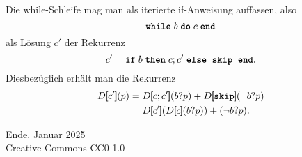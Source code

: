 \documentclass[8pt,fleqn,aspectratio=169]{beamer}
\newcommand{\modest}[1]{{\small\color{gray}#1}}
\newcommand{\kw}[1]{\textbf{\texttt{#1}}}
\newcommand{\qb}[1]{[\!\![#1]\!\!]}
\begin{document}
\begin{frame}[fragile]
Die while-Schleife mag man als iterierte if-Anweisung auffassen, also
\[\kw{while}\; b\; \kw{do}\; c\; \kw{end}\]
als Lösung $c'$ der Rekurrenz
\[c' = \kw{if}\; b\; \kw{then}\; c; c'\;
\kw{else}\;\; \kw{skip}\;\; \kw{end}.\]\pause
Diesbezüglich erhält man die Rekurrenz
\begin{align*}
D\qb{c'}(p) &= D\qb{c; c'}(b?p) + D\qb{\kw{skip}}(\lnot b?p)\\
&= D\qb{c'}(D\qb{c}(b?p)) + (\lnot b?p).
\end{align*}
\end{frame}

\begin{frame}
Ende.
\vfill\hfill\modest{Januar 2025}\\
\hfill\modest{Creative Commons CC0 1.0}
\end{frame}
\end{document}
